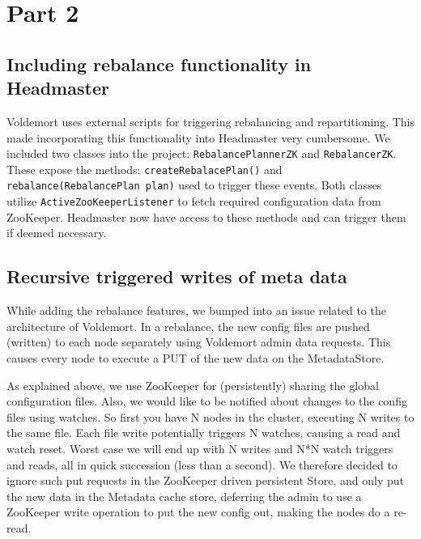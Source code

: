 \section{Part 2}

\subsection{Including rebalance functionality in Headmaster}
Voldemort uses external scripts for triggering rebalancing and repartitioning. This made incorporating this functionality into Headmaster very cumbersome. We included two classes into the project: \texttt{RebalancePlannerZK} and \texttt{RebalancerZK}. These expose the methods: \texttt{createRebalacePlan()} and \texttt{rebalance(RebalancePlan plan)} used to trigger these events. Both classes utilize \texttt{ActiveZooKeeperListener} to fetch required configuration data from ZooKeeper. Headmaster now have access to these methods and can trigger them if deemed necessary. 

\subsection{Recursive triggered writes of meta data}
While adding the rebalance features, we bumped into an issue related to the architecture of Voldemort.
In a rebalance, the new config files are pushed (written) to each node separately using Voldemort admin data requests. This causes every node to execute a PUT of the new data on the MetadataStore.

As explained above, we use ZooKeeper for (persistently) sharing the global configuration files.
Also, we would like to be notified about changes to the config files using watches. So first you have N nodes in the cluster, executing N writes to the same file. Each file write potentially triggers N watches, causing a read and watch reset. Worst case we will end up with N writes and N*N watch triggers and reads, all in quick succession (less than a second).
We therefore decided to ignore such put requests in the ZooKeeper driven persistent Store, and only put the new data in the Metadata cache store, deferring the admin to use a ZooKeeper write operation to put the new config out, making the nodes do a re-read.


